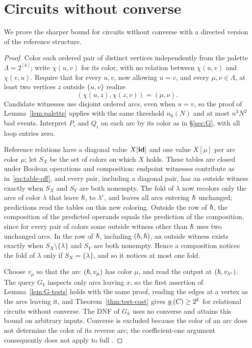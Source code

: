 \section{Circuits without converse}\label{app:directed}
We prove the sharper bound for circuits without converse with a directed
version of the reference structure.

\withoutconverse*
\begin{proof}
Color each ordered pair of distinct vertices independently from the
palette $\Lambda=2^{[k]}$; write $\chi(u,v)$ for its color, with no
relation between $\chi(u,v)$ and $\chi(v,u)$. Require that for every
$u,v$, now allowing $u=v$, and every $\mu,\nu\in\Lambda$, at least two
vertices $z$ outside $\{u,v\}$ realize
\[
 (\chi(u,z),\chi(z,v))=(\mu,\nu).
\]
Candidate witnesses use disjoint ordered arcs, even when $u=v$, so the
proof of Lemma~\ref{lem:palette} applies with the same threshold
$n_0(N)$ and at most $n^3N^2$ bad events. Interpret $P_i$ and $Q_i$ on
each arc by its color as in \S\ref{sec:G}, with all loop entries zero.

Reference relations have a diagonal value $X[\mathbf{id}]$ and one value
$X[\mu]$ per arc color $\mu$; let $S_X$ be the set of colors on which $X$
holds. These tables are closed under Boolean operations and
composition: endpoint witnesses contribute as in~\eqref{eq:table-off},
and every pair, including a diagonal pair, has an outside witness
exactly when $S_X$ and $S_Y$ are both nonempty. The fold of $\lambda$
now recolors only the arcs of color $\lambda$ that leave $\hslash$, to
$\lambda^c$, and leaves all arcs entering $\hslash$ unchanged; predictions
read the tables on this new coloring. Outside the row of $\hslash$, the
composition of the predicted operands equals the prediction of the
composition, since for every pair of colors some outside witness other
than $\hslash$ uses two unchanged arcs. In the row of $\hslash$, including
$(\hslash,\hslash)$, an outside witness exists exactly when
$S_X\setminus\{\lambda\}$ and $S_Y$ are both nonempty. Hence a
composition notices the fold of $\lambda$ only if $S_X=\{\lambda\}$, and
so it notices at most one fold.

Choose $v_\mu$ so that the arc $(\hslash,v_\mu)$ has color $\mu$, and read
the output at $(\hslash,v_{\lambda^c})$. The query $G_k$ inspects only arcs
leaving $x$, so the first assertion of Lemma~\ref{lem:G-tests} holds
with the same proof, reading the edges at a vertex as the arcs leaving
it, and Theorem~\ref{thm:test-cost} gives $g_{;}(C)\ge2^k$ for
relational circuits without converse. The DNF of $G_k$ uses no converse
and attains this bound on arbitrary inputs. Converse is excluded because
the color of an arc does not determine the color of its reverse arc; the
coefficient-one argument consequently does not apply to full \CoR.
\end{proof}
